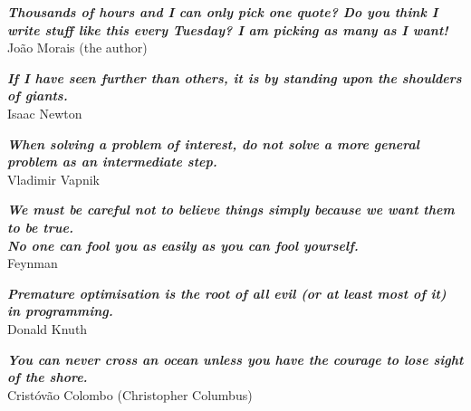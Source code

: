 
\newcommand{\citationentry}[2]{
    \small \textit{\textbf{#1}}
    \\ \vspace{2mm}  
    \scriptsize{#2}
}


\thispagestyle{empty}
\hbox{} 
\begin{flushright}
\vfill
\citationentry{Thousands of hours and I can only pick one quote? Do you think I write stuff like this every Tuesday? I am picking as many as I want!}{João Morais (the author)}

\vspace{1.5cm}

\citationentry{If I have seen further than others, it is by standing upon the shoulders of giants.}{Isaac Newton}

\vspace{1.5cm}

\citationentry{When solving a problem of interest, do not solve a more general problem as an intermediate step.}{Vladimir Vapnik}

\vspace{1.5cm}

\citationentry{We must be careful not to believe things simply because we want them to be true. \\No one can fool you as easily as you can fool yourself.}{Feynman}

\vspace{1.5cm}

\citationentry{Premature optimisation is the root of all evil (or at least most of it) in programming.}{Donald Knuth}

\vspace{1.5cm}

\citationentry{You can never cross an ocean unless you have the courage to lose sight of the shore.}{Cristóvão Colombo (Christopher Columbus)}






\end{flushright}

\clearpage
\thispagestyle{empty}
\cleardoublepage

